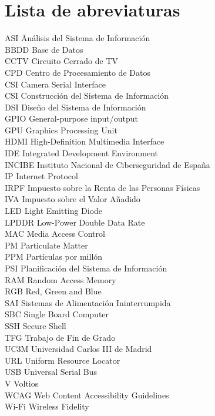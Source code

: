 \newpage %
\thispagestyle{empty}
\mbox{}

\chapter*{Lista de abreviaturas}
\begin{tabbing}  %
	ASI \quad\quad\quad\= Análisis del Sistema de Información \\
	BBDD \> Base de Datos \\
	CCTV \> Circuito Cerrado de TV \\
	CPD \> Centro de Procesamiento de Datos \\
	CSI \> Camera Serial Interface \\
	CSI \> Construcción del Sistema de Información \\
	DSI \> Diseño del Sistema de Información \\
	GPIO \> General-purpose input/output \\
	GPU \> Graphics Processing Unit \\
	HDMI \> High-Definition Multimedia Interface \\
	IDE \> Integrated Development Environment \\
	INCIBE \> Instituto Nacional de Ciberseguridad de España \\
	IP \> Internet Protocol \\
	IRPF \> Impuesto sobre la Renta de las Personas Físicas \\
	IVA \> Impuesto sobre el Valor Añadido \\
	LED \> Light Emitting Diode \\
	LPDDR \> Low-Power Double Data Rate \\
	MAC \> Media Access Control \\
	PM \> Particulate Matter \\
	PPM \> Partículas por millón \\
	PSI \> Planificación del Sistema de Información \\
	RAM \> Random Access Memory \\
	RGB \> Red, Green and Blue \\
	SAI \> Sistemas de Alimentación Ininterrumpida \\
	SBC \> Single Board Computer \\
	SSH \> Secure Shell \\
	TFG \> Trabajo de Fin de Grado \\
	UC3M \> Universidad Carlos III de Madrid \\
	URL \> Uniform Resource Locator \\
	USB \> Universal Serial Bus \\
	V \> Voltios \\
	WCAG \> Web Content Accessibility Guidelines \\
	Wi-Fi \> Wireless Fidelity
\end{tabbing}